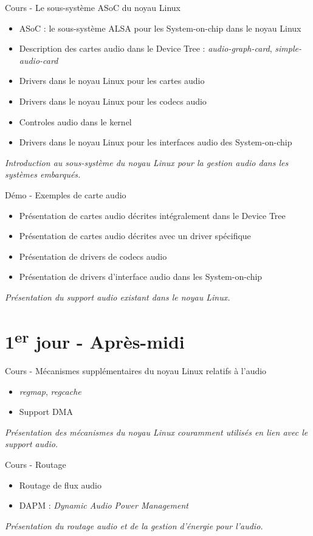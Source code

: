 \documentclass[a4paper,12pt,obeyspaces,spaces,hyphens]{article}
\begin{document}
\feagendatwocolumn
{Cours - Le sous-système ASoC du noyau Linux}
{
  \begin{itemize}
  \item ASoC : le sous-système ALSA pour les System-on-chip dans le noyau Linux
  \item Description des cartes audio dans le Device Tree : {\em
      audio-graph-card}, {\em simple-audio-card}
  \item Drivers dans le noyau Linux pour les cartes audio
  \item Drivers dans le noyau Linux pour les codecs audio
  \item Controles audio dans le kernel
  \item Drivers dans le noyau Linux pour les interfaces audio des
    System-on-chip
  \end{itemize}
  \vspace{0.5em}
  {\em Introduction au sous-système du noyau Linux pour la gestion audio dans les systèmes embarqués.}
}
{Démo - Exemples de carte audio}
{
  \begin{itemize}
  \item Présentation de cartes audio décrites intégralement dans le Device Tree
  \item Présentation de cartes audio décrites avec un driver spécifique
  \item Présentation de drivers de codecs audio
  \item Présentation de drivers d'interface audio dans les
    System-on-chip
  \end{itemize}
  \vspace{0.5em}
  {\em Présentation du support audio existant dans le noyau Linux.}
}

\section{1\textsuperscript{er} jour - Après-midi}

\feagendatwocolumn
{Cours - Mécanismes supplémentaires du noyau Linux relatifs à l'audio}
{
  \begin{itemize}
  \item {\em regmap}, {\em regcache}
  \item Support DMA
  \end{itemize}
  \vspace{0.5em}
  {\em Présentation des mécanismes du noyau Linux couramment utilisés en lien avec le support audio.}
}
{Cours - Routage}
{
  \begin{itemize}
  \item Routage de flux audio
  \item DAPM : {\em Dynamic Audio Power Management}
  \end{itemize}
  \vspace{0.5em}
  {\em Présentation du routage audio et de la gestion d'énergie pour l'audio.}
}
\end{document}
